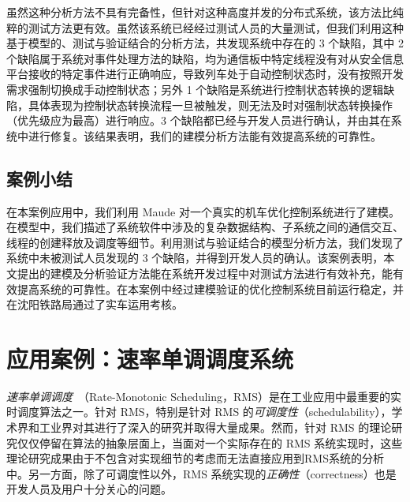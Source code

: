 虽然这种分析方法不具有完备性，但针对这种高度并发的分布式系统，该方法比纯粹的测试方法更有效。虽然该系统已经经过测试人员的大量测试，但我们利用这种基于模型的、测试与验证结合的分析方法，共发现系统中存在的 3 个缺陷，其中 2 个缺陷属于系统对事件处理方法的缺陷，均为通信板中特定线程没有对从安全信息平台接收的特定事件进行正确响应，导致列车处于自动控制状态时，没有按照开发需求强制切换成手动控制状态；另外 1 个缺陷是系统进行控制状态转换的逻辑缺陷，具体表现为控制状态转换流程一旦被触发，则无法及时对强制状态转换操作（优先级应为最高）进行响应。3 个缺陷都已经与开发人员进行确认，并由其在系统中进行修复。该结果表明，我们的建模分析方法能有效提高系统的可靠性。


\subsection{案例小结}

在本案例应用中，我们利用 Maude 对一个真实的机车优化控制系统进行了建模。在模型中，我们描述了系统软件中涉及的复杂数据结构、子系统之间的通信交互、线程的创建释放及调度等细节。利用测试与验证结合的模型分析方法，我们发现了系统中未被测试人员发现的 3 个缺陷，并得到开发人员的确认。该案例表明，本文提出的建模及分析验证方法能在系统开发过程中对测试方法进行有效补充，能有效提高系统的可靠性。在本案例中经过建模验证的优化控制系统目前运行稳定，并在沈阳铁路局通过了实车运用考核。


\section{应用案例：速率单调调度系统}
\label{s:RMS}

\hide{
\usepackage{graphicx}
\usepackage[noadjust]{cite}
\usepackage{picinpar}
\usepackage{amsmath}
\usepackage{stfloats}
\usepackage{url}
\usepackage{flushend}
\usepackage[latin1]{inputenc}
\usepackage{colortbl}
\usepackage{soul}
\usepackage{multirow}
\usepackage{pifont}
\usepackage{color}
\usepackage[hidelinks,bookmarks=false]{hyperref}
\usepackage{enumerate}
\usepackage{siunitx}
\usepackage{breakurl}
\usepackage{epstopdf}
\usepackage{pbox}
}


\hide{
\makeatletter
\def\verbatim{\small\@verbatim \frenchspacing\@vobeyspaces \@xverbatim}
\makeatother
}


\emph{速率单调调度}~\cite{DBLP:journals/jacm/LiuL73}（Rate-Monotonic Scheduling，RMS）是在工业应用中最重要的实时调度算法之一。针对 RMS，特别是针对 RMS 的\emph{可调度性}（schedulability），学术界和工业界对其进行了深入的研究并取得大量成果。然而，针对 RMS 的理论研究仅仅停留在算法的抽象层面上，当面对一个实际存在的 RMS 系统实现时，这些理论研究成果由于不包含对实现细节的考虑而无法直接应用到RMS系统的分析中。另一方面，除了可调度性以外，RMS 系统实现的\emph{正确性}（correctness）也是开发人员及用户十分关心的问题。

